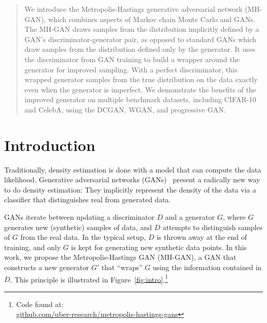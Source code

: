 \documentclass{article}
\begin{document}
\begin{abstract}
We introduce the Metropolis-Hastings generative adversarial network (MH-GAN), which combines aspects of Markov chain Monte Carlo and GANs.
The MH-GAN draws samples from the distribution implicitly defined by a GAN's discriminator-generator pair, as opposed to standard GANs which draw samples from the distribution defined only by the generator.
It uses the discriminator from GAN training to build a wrapper around the generator for improved sampling.
With a perfect discriminator, this wrapped generator samples from the true distribution on the data exactly even when the generator is imperfect.
We demonstrate the benefits of the improved generator on multiple benchmark datasets, including CIFAR-10 and CelebA, using the DCGAN, WGAN, and progressive GAN\@.
\end{abstract}

\section{Introduction}

Traditionally, density estimation is done with a model that can compute the data likelihood.
Generative adversarial networks (GANs)~\citep{Goodfellow2014} present a radically new way to do density estimation:
They implicitly represent the density of the data via a classifier that distinguishes real from generated data.

GANs iterate between updating a discriminator $D$ and a generator $G$, where $G$ generates new (synthetic) samples of data, and $D$ attempts to distinguish samples of $G$ from the real data.
In the typical setup, $D$ is thrown away at the end of training, and only $G$ is kept for generating new synthetic data points.
In this work, we propose the Metropolis-Hastings GAN (MH-GAN), a GAN that constructs a new generator $G'$ that ``wraps'' $G$ using the information contained in $D$.
This principle is illustrated in Figure~\ref{fig:intro}.\footnote{Code found at:\\ \scriptsize{\url{github.com/uber-research/metropolis-hastings-gans}}}
\end{document}
